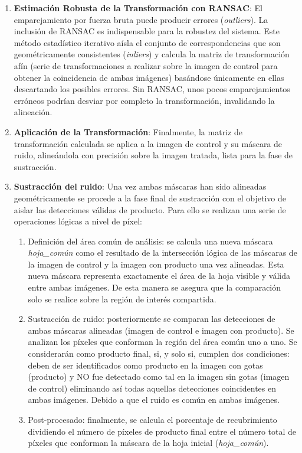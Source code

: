 \begin{enumerate}
    \item \textbf{Estimación Robusta de la Transformación con RANSAC}: El emparejamiento por fuerza bruta puede producir errores (\textit{outliers}). La inclusión de RANSAC\cite{VINAYA2015174} es indispensable para la robustez del sistema. Este método estadístico iterativo aísla el conjunto de correspondencias que son geométricamente consistentes (\textit{inliers}) y calcula la matriz de transformación afín (serie de transformaciones a realizar sobre la imagen de control para obtener la coincidencia de ambas imágenes) basándose únicamente en ellas descartando los posibles errores. Sin RANSAC, unos pocos emparejamientos erróneos podrían desviar por completo la transformación, invalidando la alineación.

    \item \textbf{Aplicación de la Transformación}: Finalmente, la matriz de transformación calculada se aplica a la imagen de control y su máscara de ruido, alineándola con precisión sobre la imagen tratada, lista para la fase de sustracción.

    \item \textbf{Sustracción del ruido}: Una vez ambas máscaras han sido alineadas geométricamente se procede a la fase final de sustracción con el objetivo de aislar las detecciones válidas de producto. Para ello se realizan una serie de operaciones lógicas a nivel de píxel:

\begin{enumerate}
    \item Definición del área común de análisis: se calcula una nueva máscara \textit{hoja\_común} como el resultado de la intersección lógica de las máscaras de la imagen de control y la imagen con producto una vez alineadas. Esta nueva máscara representa exactamente el área de la hoja visible y válida entre ambas imágenes. De esta manera se asegura que la comparación solo se realice sobre la región de interés compartida.

    \item Sustracción de ruido: posteriormente se comparan las detecciones de ambas máscaras alineadas (imagen de control e imagen con producto). Se analizan los píxeles que conforman la región del área común uno a uno. Se considerarán como producto final, si, y solo si, cumplen dos condiciones: deben de ser identificados como producto en la imagen con gotas (producto) y NO fue detectado como tal en la imagen sin gotas (imagen de control) eliminando así todas aquellas detecciones coincidentes en ambas imágenes. Debido a que el ruido es común en ambas imágenes.

    \item Post-procesado: finalmente, se calcula el porcentaje de recubrimiento dividiendo el número de píxeles de producto final entre el número total de píxeles que conforman la máscara de la hoja inicial (\textit{hoja\_común}).

\end{enumerate}


\end{enumerate}
